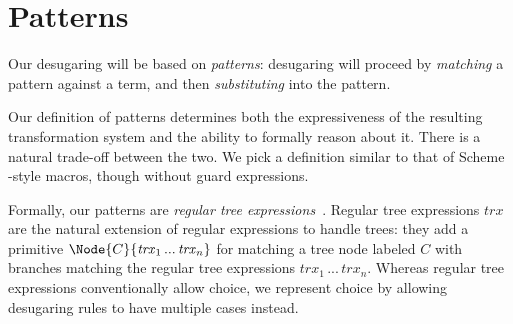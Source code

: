 \section{Patterns}

Our desugaring will be based on \emph{patterns}: desugaring will
proceed by \emph{matching} a  pattern against a term, and then
\emph{substituting} into the  pattern.

Our definition of patterns determines both the expressiveness of the
resulting transformation system and the ability to formally reason about
it. There is a natural trade-off between the two. We pick a definition similar to
that of Scheme -style macros, though without guard
expressions.

Formally, our patterns are \emph{regular tree
  expressions}~\cite{regular-tree-expressions}. Regular tree
expressions $\mathit{trx}$ are the natural extension of regular
expressions to handle trees: they add a primitive $\Node{C}{\mathit{trx}_1
\,...\,\mathit{trx}_n}$ for matching a tree node labeled $C$ with
branches matching the regular tree expressions
$\mathit{trx}_1\,...\,\mathit{trx}_n$. Whereas regular tree
expressions conventionally allow choice, we represent choice by
allowing desugaring rules to have multiple cases instead.

